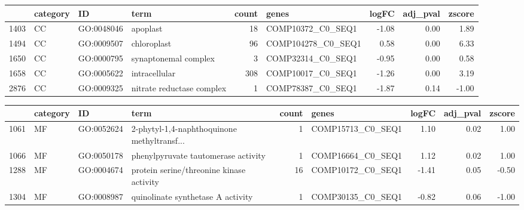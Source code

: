 \documentclass[10pt,oneside,a4paper]{article}
\begin{document}
\begin{table}[ht]
\centering
\begin{tabular}{rlllrlrrr}
  \hline
 & category & ID & term & count & genes & logFC & adj\_pval & zscore \\ 
  \hline
1403 & CC & GO:0048046 & apoplast &  18 & COMP10372\_C0\_SEQ1 & -1.08 & 0.00 & 1.89 \\ 
  1494 & CC & GO:0009507 & chloroplast &  96 & COMP104278\_C0\_SEQ1 & 0.58 & 0.00 & 6.33 \\ 
  1650 & CC & GO:0000795 & synaptonemal complex &   3 & COMP32314\_C0\_SEQ1 & -0.95 & 0.00 & 0.58 \\ 
  1658 & CC & GO:0005622 & intracellular & 308 & COMP10017\_C0\_SEQ1 & -1.26 & 0.00 & 3.19 \\ 
  2876 & CC & GO:0009325 & nitrate reductase complex &   1 & COMP78387\_C0\_SEQ1 & -1.87 & 0.14 & -1.00 \\ 
   \hline
\end{tabular}
\end{table}

\begin{table}[ht]
\centering
\begin{tabular}{rlllrlrrr}
  \hline
 & category & ID & term & count & genes & logFC & adj\_pval & zscore \\ 
  \hline
1061 & MF & GO:0052624 & 2-phytyl-1,4-naphthoquinone methyltransf... &   1 & COMP15713\_C0\_SEQ1 & 1.10 & 0.02 & 1.00 \\ 
  1066 & MF & GO:0050178 & phenylpyruvate tautomerase activity &   1 & COMP16664\_C0\_SEQ1 & 1.12 & 0.02 & 1.00 \\ 
  1288 & MF & GO:0004674 & protein serine/threonine kinase activity &  16 & COMP10172\_C0\_SEQ1 & -1.41 & 0.05 & -0.50 \\ 
  1304 & MF & GO:0008987 & quinolinate synthetase A activity &   1 & COMP30135\_C0\_SEQ1 & -0.82 & 0.06 & -1.00 \\ 
   \hline
\end{tabular}
\end{table}
\end{document}
